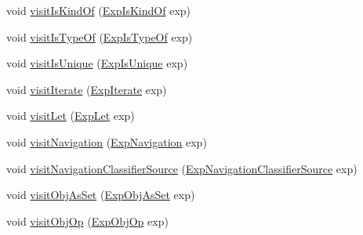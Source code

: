 \begin{DoxyCompactItemize}
\item 
void \hyperlink{classorg_1_1tzi_1_1use_1_1uml_1_1ocl_1_1expr_1_1_expression_print_visitor_aac629089e289a770a09c3112bf8844be}{visit\-Is\-Kind\-Of} (\hyperlink{classorg_1_1tzi_1_1use_1_1uml_1_1ocl_1_1expr_1_1_exp_is_kind_of}{Exp\-Is\-Kind\-Of} exp)
\item 
void \hyperlink{classorg_1_1tzi_1_1use_1_1uml_1_1ocl_1_1expr_1_1_expression_print_visitor_abde9dcd0742106a0d9de34d933a3a82c}{visit\-Is\-Type\-Of} (\hyperlink{classorg_1_1tzi_1_1use_1_1uml_1_1ocl_1_1expr_1_1_exp_is_type_of}{Exp\-Is\-Type\-Of} exp)
\item 
void \hyperlink{classorg_1_1tzi_1_1use_1_1uml_1_1ocl_1_1expr_1_1_expression_print_visitor_aa65cc64156156d58e7876218684e53c7}{visit\-Is\-Unique} (\hyperlink{classorg_1_1tzi_1_1use_1_1uml_1_1ocl_1_1expr_1_1_exp_is_unique}{Exp\-Is\-Unique} exp)
\item 
void \hyperlink{classorg_1_1tzi_1_1use_1_1uml_1_1ocl_1_1expr_1_1_expression_print_visitor_aa1a046893f3312f9ea0a8dd39927cc6f}{visit\-Iterate} (\hyperlink{classorg_1_1tzi_1_1use_1_1uml_1_1ocl_1_1expr_1_1_exp_iterate}{Exp\-Iterate} exp)
\item 
void \hyperlink{classorg_1_1tzi_1_1use_1_1uml_1_1ocl_1_1expr_1_1_expression_print_visitor_a1c868e8991eaa4aedcac04e8754c7456}{visit\-Let} (\hyperlink{classorg_1_1tzi_1_1use_1_1uml_1_1ocl_1_1expr_1_1_exp_let}{Exp\-Let} exp)
\item 
void \hyperlink{classorg_1_1tzi_1_1use_1_1uml_1_1ocl_1_1expr_1_1_expression_print_visitor_a5a628b2a79f95c10cab99d6950f30745}{visit\-Navigation} (\hyperlink{classorg_1_1tzi_1_1use_1_1uml_1_1ocl_1_1expr_1_1_exp_navigation}{Exp\-Navigation} exp)
\item 
void \hyperlink{classorg_1_1tzi_1_1use_1_1uml_1_1ocl_1_1expr_1_1_expression_print_visitor_af392e18cbff14ad5c40d2bcc93af6be7}{visit\-Navigation\-Classifier\-Source} (\hyperlink{classorg_1_1tzi_1_1use_1_1uml_1_1ocl_1_1expr_1_1_exp_navigation_classifier_source}{Exp\-Navigation\-Classifier\-Source} exp)
\item 
void \hyperlink{classorg_1_1tzi_1_1use_1_1uml_1_1ocl_1_1expr_1_1_expression_print_visitor_aa6a269340d4b1b7d9c4acdd9e6ad4bd2}{visit\-Obj\-As\-Set} (\hyperlink{classorg_1_1tzi_1_1use_1_1uml_1_1ocl_1_1expr_1_1_exp_obj_as_set}{Exp\-Obj\-As\-Set} exp)
\item 
void \hyperlink{classorg_1_1tzi_1_1use_1_1uml_1_1ocl_1_1expr_1_1_expression_print_visitor_a229d31801a0eaeffef8ec5d97e871423}{visit\-Obj\-Op} (\hyperlink{classorg_1_1tzi_1_1use_1_1uml_1_1ocl_1_1expr_1_1_exp_obj_op}{Exp\-Obj\-Op} exp)

\end{DoxyCompactItemize}
